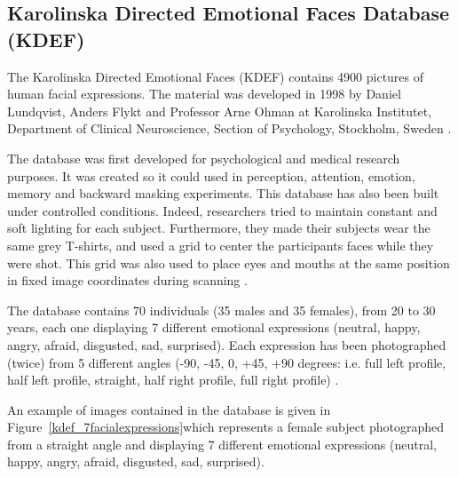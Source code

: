\subsection{Karolinska Directed Emotional Faces Database (KDEF)}

\vspace{\baselineskip}
\noindent The Karolinska Directed Emotional Faces (KDEF) contains 4900 pictures of human facial expressions. The material was developed in 1998 by Daniel Lundqvist, Anders Flykt and Professor Arne Ohman at Karolinska Institutet, Department of Clinical Neuroscience, Section of Psychology, Stockholm, Sweden \cite{KDEF}.
\newline

\noindent The database was first developed for psychological and medical research purposes. It was created so it could used in perception, attention, emotion, memory and backward masking experiments. This database has also been built under controlled conditions. Indeed, researchers tried to maintain constant and soft lighting for each subject. Furthermore, they made their subjects wear the same grey T-shirts, and used a grid to center the participants faces while they were shot. This grid was also used to place eyes and mouths at the same position in fixed image coordinates during scanning \cite{KDEF}.
\newline

\noindent The database contains 70 individuals (35 males and 35 females), from 20 to 30 years, each one displaying 7 different emotional expressions (neutral, happy, angry, afraid, disgusted, sad, surprised). Each expression has been photographed (twice) from 5 different angles (-90, -45, 0, +45, +90 degrees: i.e. full left profile, half left profile, straight, half right profile, full right profile)  \cite{KDEF}.
\newline

\noindent An example of images contained in the database is given in Figure~\ref{kdef_7facialexpressions}which represents a female subject photographed from a straight angle and displaying 7 different emotional expressions (neutral, happy, angry, afraid, disgusted, sad, surprised).
\newline


